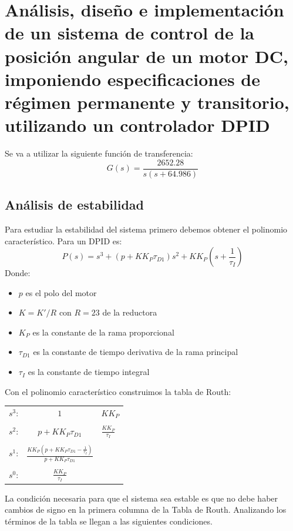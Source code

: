\documentclass[a4paper]{article}
\begin{document}
\section{Análisis, diseño e implementación de un sistema de control de la posición angular de un motor DC, imponiendo especificaciones de régimen permanente y transitorio, utilizando un controlador D\textbar PID}
Se va a utilizar la siguiente función de transferencia:
\begin{equation}
G(s)=\frac{2652.28}{s(s+64.986)}
\end{equation}
\subsection{Análisis de estabilidad \label{estabilidad}}
Para estudiar la estabilidad del sistema primero debemos obtener el polinomio característico. Para un D\textbar PID es:
\begin{equation}
P(s)=s^3+(p+K K_P\tau_{D1})s^2+K K_P(s+\frac{1}{\tau_I})
\end{equation}
Donde:
\begin{itemize}
	\item $p$ es el polo del motor
	\item $K=K'/R$ con $R=23$ de la reductora
	\item $K_P$ es la constante de la rama proporcional
	\item $\tau_{D1}$ es la constante de tiempo derivativa de la rama principal
	\item $\tau_I$ es la constante de tiempo integral
\end{itemize}

Con el polinomio característico construimos la tabla de Routh:
\begin{center}
	\begin{tabular}{ccl}
		$s^3$: & $1$ & $K K_P$ \\ \\
		$s^2$: & $p+K K_P \tau_{D1}$ & $\displaystyle\frac{K K_P}{\tau_I}$ \\ \\
		$s^1$: & $\displaystyle\frac{K K_P (p+K K_P \tau_{D1} -\frac{1}{\tau_I})}{p+K K_P \tau_{D1}}$ & \\ \\
		$s^0$: & $\displaystyle\frac{K K_P}{\tau_I}$ &
	\end{tabular}
\end{center}

La condición necesaria para que el sistema sea estable es que no debe haber cambios de signo en la primera columna de la Tabla de Routh. Analizando los términos de la tabla se llegan a las siguientes condiciones.
\end{document}
